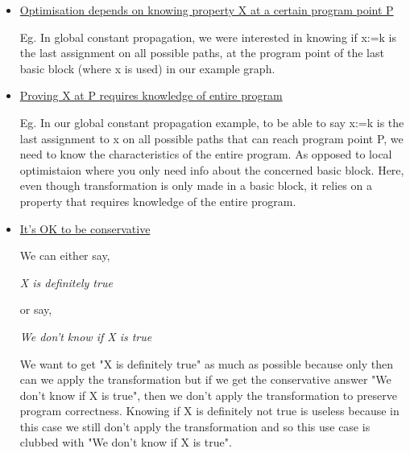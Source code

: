 \begin{itemize}
    \item \underline{Optimisation depends on knowing property X at a certain program point P}
    
    Eg. In global constant propagation, we were interested in knowing if x:=k is the last assignment on all possible paths, at the program point of the last basic block (where x is used) in our example graph.
    
    \item \underline{Proving X at P requires knowledge of entire program}
    
    Eg. In our global constant propagation example, to be able to say x:=k is the last assignment to x on all possible paths that can reach program point P, we need to know the characteristics of the entire program. As opposed to local optimistaion where you only need info about the concerned basic block. Here, even though transformation is only made in a basic block, it relies on a property that requires knowledge of the entire program.
    
    \item \underline{It's OK to be conservative}
    
    We can either say,
    \begin{center}
        \textit{X is definitely true}
    \end{center}
    or say,
    \begin{center}
        \textit{We don't know if X is true}    
    \end{center}
    
    We want to get "X is definitely true" as much as possible because only then can we apply the transformation but if we get the conservative answer "We don't know if X is true", then we don't apply the transformation to preserve program correctness. Knowing if X is definitely not true is useless because in this case we still don't apply the transformation and so this use case is clubbed with "We don't know if X is true".
\end{itemize}